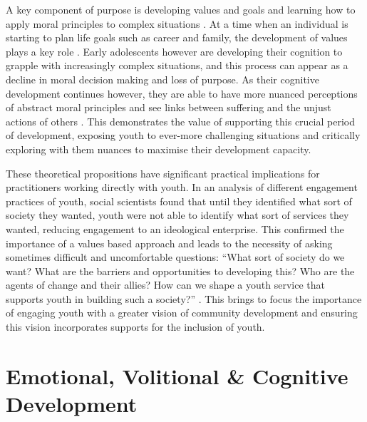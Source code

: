 A key component of purpose is developing values and goals and learning how to apply moral principles to complex situations \citep{Malin2015}. At a time when an individual is starting to plan life goals such as career and family, the development of values plays a key role \citep{Nurmi1991}. Early adolescents however are developing their cognition to grapple with increasingly complex situations, and this process can appear as a decline in moral decision making and loss of purpose. As their cognitive development continues however, they are able to have more nuanced perceptions of abstract moral principles and see links between suffering and the unjust actions of others \citep{Malin2015}. This demonstrates the value of supporting this crucial period of development, exposing youth to ever-more challenging situations and critically exploring with them nuances to maximise their development capacity.

These theoretical propositions have significant practical implications for practitioners working directly with youth. In an analysis of different engagement practices of youth, social scientists \citet[][]{Shukra2012} found that until they identified what sort of society they wanted, youth were not able to identify what sort of services they wanted, reducing engagement to an ideological enterprise. This confirmed the importance of a values based approach and leads to the necessity of asking sometimes difficult and uncomfortable questions: “What sort of society do we want? What are the barriers and opportunities to developing this? Who are the agents of change and their allies? How can we shape a youth service that supports youth in building such a society?” \citep[][p52]{Shukra2012}. This brings to focus the importance of engaging youth with a greater vision of community development and ensuring this vision incorporates supports for the inclusion of youth.



\section{Emotional, Volitional \& Cognitive Development} 

